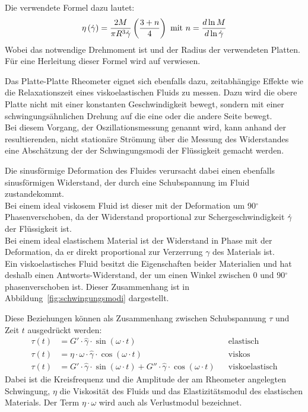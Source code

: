 Die verwendete Formel dazu lautet:
\begin{equation}
    \label{eq:platterheovisko}
    \eta\left( \dot\gamma \right) = \frac{2M}{\pi R^3 \dot\gamma}\left( \frac{3+n}{4} \right) \text{ mit } n=\frac{d\ln M}{d\ln\dot\gamma}
\end{equation}
Wobei  das notwendige Drehmoment ist und  der Radius der verwendeten Platten.
Für eine Herleitung dieser Formel wird auf \cite{introtorheo} verwiesen.

Das Platte-Platte Rheometer eignet sich ebenfalls dazu, zeitabhängige Effekte wie die Relaxationszeit eines viskoelastischen Fluids zu messen.
Dazu wird die obere Platte nicht mit einer konstanten Geschwindigkeit bewegt, sondern mit einer schwingungsähnlichen Drehung auf die eine oder die andere Seite bewegt.\\
Bei diesem Vorgang, der Oszillationsmessung genannt wird, kann anhand der resultierenden, nicht stationäre Strömung über die Messung des Widerstandes eine Abschätzung der der Schwingungsmodi der Flüssigkeit gemacht werden.

Die sinusförmige Deformation  des Fluides verursacht dabei einen ebenfalls sinusförmigen Widerstand, der durch eine Schubspannung  im Fluid zustandekommt.\\
Bei einem ideal viskosem Fluid ist dieser mit der Deformation um 90$^\circ$ Phasenverschoben, da der Widerstand proportional zur Schergeschwindigkeit $\dot\gamma$ der Flüssigkeit ist.\\
Bei einem ideal elastischem Material ist der Widerstand in Phase mit der Deformation, da er direkt proportional zur Verzerrung $\gamma$ des Materials ist.\\
Ein viskoelastisches Fluid besitzt die Eigenschaften beider Materialien und hat deshalb einen Antworts-Widerstand, der um einen Winkel zwischen 0 und 90$^\circ$ phasenverschoben ist. Dieser Zusammenhang ist in Abbildung~\ref{fig:schwingungsmodi} dargestellt.

Diese Beziehungen können als Zusammenhang zwischen Schubspannung $\tau$ und Zeit $t$ ausgedrückt werden:
\begin{align}
    \label{eq:schwingungsmodi}
    \tau\left( t \right)&=G'\cdot\hat{\gamma}\cdot \sin\left( \omega\cdot t \right) && \text{elastisch}\\
    \tau\left( t \right)&=\eta\cdot\omega\cdot\hat{\gamma}\cdot \cos\left( \omega\cdot t \right)&& \text{viskos}\\
    \tau\left( t \right)&=G'\cdot\hat{\gamma}\cdot \sin\left( \omega\cdot t \right)+G''\cdot\hat{\gamma}\cdot \cos\left( \omega\cdot t \right)&& \text{viskoelastisch}
\end{align}
Dabei ist  die Kreisfrequenz und  die Amplitude der am Rheometer angelegten Schwingung, $\eta$ die Viskosität des Fluids und  das Elastizitätsmodul des elastischen Materials. Der Term $\eta\cdot\omega$ wird auch als Verlustmodul  bezeichnet.

